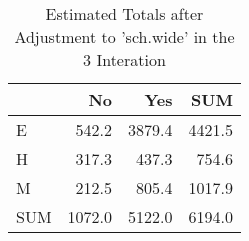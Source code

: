 \begin{table}[ht]
\centering
\caption{Estimated Totals after Adjustment to 'sch.wide' in the 3 Interation} 
\begin{tabular}{l|rr|r}
  & No & Yes & SUM \\ 
  \hline
E & 542.2 & 3879.4 & 4421.5 \\ 
  H & 317.3 & 437.3 & 754.6 \\ 
  M & 212.5 & 805.4 & 1017.9 \\ 
   \hline
SUM & 1072.0 & 5122.0 & 6194.0 \\ 
  \end{tabular}
\end{table}
